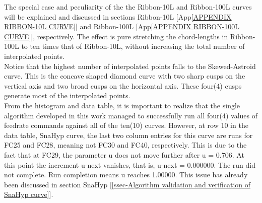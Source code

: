 The special case and peculiarity of the the Ribbon-10L and Ribbon-100L curves will be explained and discussed in sections Ribbon-10L [App\ref{APPENDIX RIBBON-10L CURVE}] and Ribbon-100L [App\ref{APPENDIX RIBBON-100L CURVE}], respectively. The  effect is pure stretching the chord-lengths in Ribbon-100L to ten times that of Ribbon-10L, without increasing the total number of interpolated points.\\

Notice that the highest number of interpolated points falls to the Skewed-Astroid curve. This is the concave shaped diamond curve with two sharp cusps on the vertical axis and two broad cusps on the horizontal axis. These four(4) cusps generate most of the interpolated points. \\

From the histogram and data table, it is important to realize that the single algorithm developed in this work managed to successfully run all four(4) values of feedrate commands against all of the ten(10) curves. However, at row 10 in the data table, SnaHyp curve, the last two column entries for this curve are runs for FC25 and FC28, meaning not FC30 and FC40, respectively. This is due to the fact that at FC29, the parameter u does not move further after u = 0.706. At this point the increment u-next vanishes, that is, u-next = 0.000000. The run did not complete. Run completion means u reaches 1.00000. This issue has already been discussed in section SnaHyp [\ref{ssec-Algorithm validation and verification of SnaHyp curve}]. 


